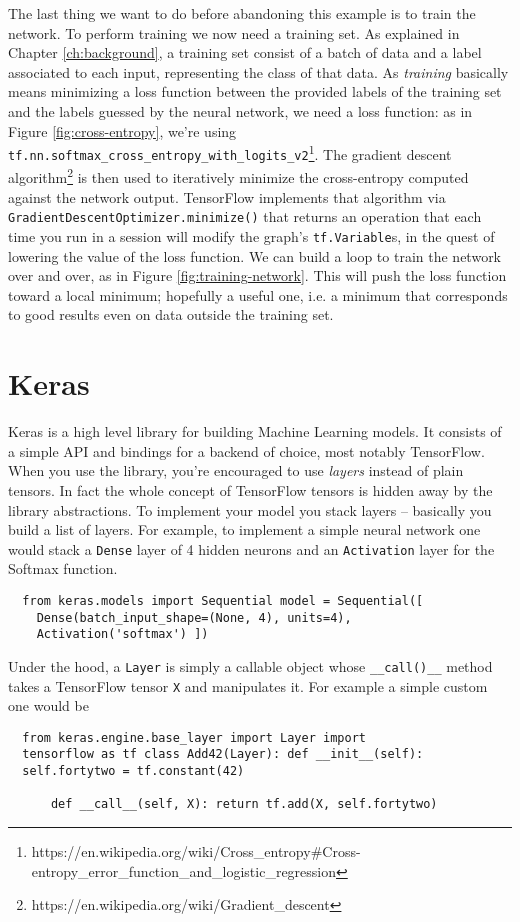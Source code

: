 The last thing we want to do before abandoning this example is to train
the network. To perform training we now need a training set. As
explained in Chapter \ref{ch:background}, a training set consist of a
batch of data and a label associated to each input, representing the
class of that data. As \emph{training} basically means minimizing a
loss function between the provided labels of the training set and the
labels guessed by the neural network, we need a loss function: as in
Figure \ref{fig:cross-entropy}, we're using
\texttt{tf.nn.softmax\_cross\_entropy\_with\_logits\_v2}\footnote{https://en.wikipedia.org/wiki/Cross\_entropy\#Cross-entropy\_error\_function\_and\_logistic\_regression}.
The gradient descent
algorithm\footnote{https://en.wikipedia.org/wiki/Gradient\_descent} is
then used to iteratively minimize the cross-entropy computed against
the network output. TensorFlow implements that algorithm via
\texttt{GradientDescentOptimizer.minimize()} that returns an operation
that each time you run in a session will modify the graph's
\texttt{tf.Variable}s, in the quest of lowering the value of the loss
function. We can build a loop to train the network over and over, as in
Figure \ref{fig:training-network}. This will push the loss function
toward a local minimum; hopefully a useful one, i.e. a minimum that
corresponds to good results even on data outside the training set.

\section{Keras}
\label{sec:keras}

Keras is a high level library for building Machine Learning
models. It consists of a simple API and bindings for a
backend of choice, most notably TensorFlow. When you use the
library, you're encouraged to use \emph{layers} instead of
plain tensors. In fact the whole concept of TensorFlow
tensors is hidden away by the library abstractions. To
implement your model you stack layers -- basically you build
a list of layers. For example, to implement a simple neural
network one would stack a \texttt{Dense} layer of 4 hidden
neurons and an \texttt{Activation} layer for the Softmax
function.

\begin{verbatim}
  from keras.models import Sequential model = Sequential([
    Dense(batch_input_shape=(None, 4), units=4),
    Activation('softmax') ])
\end{verbatim}

Under the hood, a \texttt{Layer} is simply a callable object
whose \texttt{\_\_call()\_\_} method takes a TensorFlow
tensor \texttt{X} and manipulates it. For example a simple
custom one would be
\begin{verbatim}
  from keras.engine.base_layer import Layer import
  tensorflow as tf class Add42(Layer): def __init__(self):
  self.fortytwo = tf.constant(42)

      def __call__(self, X): return tf.add(X, self.fortytwo)
\end{verbatim}


